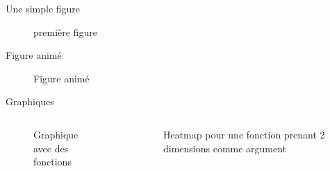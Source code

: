 
\begin{frame}{ Une simple figure}
\begin{figure}
    \centering
    
    \caption{première figure}

\end{figure}
    
\end{frame}


\begin{frame}{Figure animé}

    \begin{figure}
        \centering
        
        \caption{Figure animé}
    
    \end{figure}
    
\end{frame}


\begin{frame}{Graphiques}
    \begin{columns}
        \begin{column}{0.45\textwidth}
            \begin{figure}[h]
                \centering
                
                \caption{Graphique avec des fonctions}
            \end{figure}
            
        \end{column}
        \begin{column}{0.45\textwidth}
            \begin{figure}[h]
                \centering
                
                \caption{Heatmap pour une fonction prenant 2 dimensions comme argument}
            \end{figure} 
            
        \end{column}
    \end{columns}
\end{frame}

